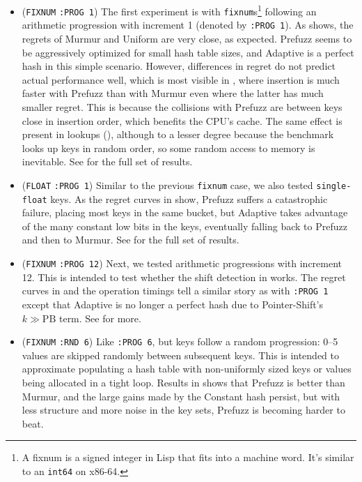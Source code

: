 \documentclass[sigconf]{acmart}
\newcommand*\lisp[1]{\texttt{#1}}
\begin{document}
\begin{itemize}
\item{(\texttt{FIXNUM} \texttt{:PROG 1})}
The first experiment is with \lisp{fixnum}s\footnote{A fixnum is a signed integer in Lisp that fits into a machine word. It's similar to an \texttt{int64} on x86-64.} following an arithmetic progression with increment 1 (denoted by \texttt{:PROG 1}).
As  shows, the regrets of Murmur and Uniform are very close, as expected.
Prefuzz seems to be aggressively optimized for small hash table sizes, and Adaptive is a perfect hash in this simple scenario.
However, differences in regret do not predict actual performance well, which is most visible in , where insertion is much faster with Prefuzz than with Murmur even where the latter has much smaller regret.
This is because the collisions with Prefuzz are between keys close in insertion order, which benefits the CPU's cache.
The same effect is present in lookups (), although to a lesser degree because the benchmark looks up keys in random order, so some random access to memory is inevitable.
See  for the full set of results.

\item{(\texttt{FLOAT} \texttt{:PROG 1})}
Similar to the previous \lisp{fixnum} case, we also tested \lisp{single-float} keys.
As the regret curves in  show, Prefuzz suffers a catastrophic failure, placing most keys in the same bucket, but Adaptive takes advantage of the many constant low bits in the keys, eventually falling back to Prefuzz and then to Murmur.
See  for the full set of results.

\item{(\texttt{FIXNUM} \texttt{:PROG 12})}
Next, we tested arithmetic progressions with increment 12.
This is intended to test whether the shift detection in  works.
The regret curves in  and the operation timings tell a similar story as with \texttt{:PROG 1} except that Adaptive is no longer a perfect hash due to Pointer-Shift's $k \gg \mathrm{PB}$ term.
See  for more.

\item{(\texttt{FIXNUM} \texttt{:RND 6})}
Like \texttt{:PROG 6}, but keys follow a random progression: 0--5 values are skipped randomly between subsequent keys.
This is intended to approximate populating a hash table with non-uniformly sized keys or values being allocated in a tight loop.
Results in  shows that Prefuzz is better than Murmur, and the large gains made by the Constant hash persist, but with less structure and more noise in the key sets, Prefuzz is becoming harder to beat.


\end{itemize}
\end{document}
